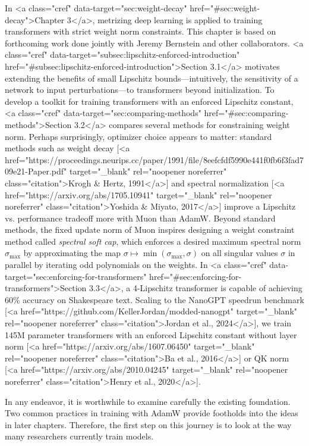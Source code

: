 In <a class="cref" data-target="sec:weight-decay" href="#sec:weight-decay">Chapter 3</a>, metrizing deep learning is applied to training transformers with strict weight norm constraints. This chapter is based on forthcoming work done jointly with Jeremy Bernstein and other collaborators. <a class="cref" data-target="subsec:lipschitz-enforced-introduction" href="#subsec:lipschitz-enforced-introduction">Section 3.1</a> motivates extending the benefits of small Lipschitz bounds---intuitively, the sensitivity of a network to input perturbations---to transformers beyond initialization. To develop a toolkit for training transformers with an enforced Lipschitz constant, <a class="cref" data-target="sec:comparing-methods" href="#sec:comparing-methods">Section 3.2</a> compares several methods for constraining weight norm. Perhaps surprisingly, optimizer choice appears to matter: standard methods such as weight decay [<a href="https://proceedings.neurips.cc/paper/1991/file/8eefcfdf5990e441f0fb6f3fad709e21-Paper.pdf" target="_blank" rel="noopener noreferrer" class="citation">Krogh & Hertz, 1991</a>] and spectral normalization [<a href="https://arxiv.org/abs/1705.10941" target="_blank" rel="noopener noreferrer" class="citation">Yoshida & Miyato, 2017</a>] improve a Lipschitz vs. performance tradeoff more with Muon than AdamW. Beyond standard methods, the fixed update norm of Muon inspires designing a weight constraint method called \textit{spectral soft cap}, which enforces a desired maximum spectral norm $\sigma_\text{max}$ by approximating the map $\sigma \mapsto \min(\sigma_\text{max}, \sigma)$ on all singular values $\sigma$ in parallel by iterating odd polynomials on the weights. In <a class="cref" data-target="sec:enforcing-for-transformers" href="#sec:enforcing-for-transformers">Section 3.3</a>, a 4-Lipschitz transformer is capable of achieving 60\% accuracy on Shakespeare text. Scaling to the NanoGPT speedrun benchmark [<a href="https://github.com/KellerJordan/modded-nanogpt" target="_blank" rel="noopener noreferrer" class="citation">Jordan et al., 2024</a>], we train 145M parameter transformers with an enforced Lipschitz constant without layer norm [<a href="https://arxiv.org/abs/1607.06450" target="_blank" rel="noopener noreferrer" class="citation">Ba et al., 2016</a>] or QK norm [<a href="https://arxiv.org/abs/2010.04245" target="_blank" rel="noopener noreferrer" class="citation">Henry et al., 2020</a>].

In any endeavor, it is worthwhile to examine carefully the existing foundation. Two common practices in training with AdamW provide footholds into the ideas in later chapters. Therefore, the first step on this journey is to look at the way many researchers currently train models.

